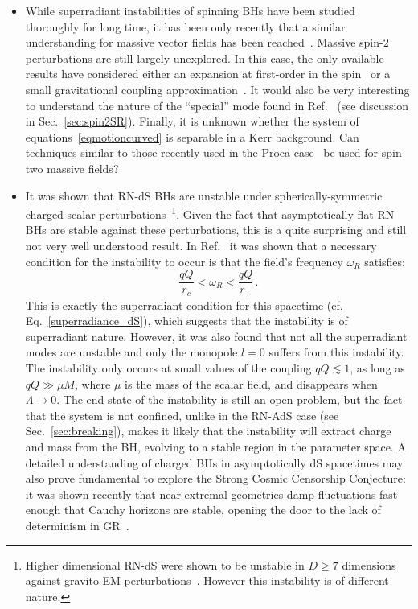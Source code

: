 \documentclass[11pt]{article}
\newcommand{\be}{\begin{equation}}
\newcommand{\ee}{\end{equation}}
\numberwithin{equation}{section} %
\begin{document}
\begin{itemize}

\item While superradiant instabilities of spinning BHs have been studied thoroughly for long time, it has 
been only recently that a similar understanding for massive vector fields has been 
reached~\cite{Pani:2012vp,Pani:2012bp,Witek:2012tr,Baryakhtar:2017ngi,East:2017mrj,East:2018glu,Frolov:2018pys,
Frolov:2018ezx}. Massive spin-$2$ perturbations are still largely unexplored.  
In this case, the only available results have considered either an expansion at first-order in the 
spin~\cite{Brito:2013wya} or a small gravitational coupling approximation~\cite{Brito:2020lup}. It would also be very 
interesting to understand the nature of the 
``special'' mode found in Ref.~\cite{Brito:2013wya} (see discussion in Sec.~\ref{sec:spin2SR}).
Finally, it is unknown whether the system of 
equations~\eqref{eqmotioncurved} is separable in a Kerr background. Can techniques similar to those recently used in 
the Proca case~\cite{Frolov:2018pys,Frolov:2018ezx} be used for spin-two massive fields?

\item It was shown that RN-dS BHs are unstable under 
spherically-symmetric charged scalar perturbations~\cite{Zhu:2014sya,Konoplya:2014lha,Destounis:2019hca}\footnote{Higher dimensional RN-dS 
were shown to be unstable in $D\geq 
7$ dimensions against gravito-EM perturbations~\cite{Konoplya:2008au,Cardoso:2010rz,Konoplya:2013sba}. However this 
instability is of different nature.}. Given the fact that asymptotically flat RN BHs are stable against these 
perturbations, this is a quite surprising and still not very well understood result. In Ref.~\cite{Konoplya:2014lha} it 
was shown that a necessary condition for the instability to occur is that the field's frequency $\omega_R$ satisfies:
%
\be
\frac{qQ}{r_c}<\omega_R<\frac{qQ}{r_+}\,.
\ee
%
This is exactly the superradiant condition for this spacetime  (cf. Eq.~\eqref{superradiance_dS}), which suggests that the instability is of superradiant nature. However, it was also found that not all the superradiant modes are unstable and only the monopole $l=0$ suffers from this instability. The instability only occurs at small values of the coupling $q Q\lesssim 1$, as long as $qQ\gg \mu M$, where $\mu$ is the mass of the scalar field, and disappears when $\Lambda\to 0$.  
The end-state of the instability is still an open-problem, but the fact that the system is not confined, unlike in the RN-AdS case (see Sec.~\ref{sec:breaking}), makes it likely that the instability will extract charge and mass from the BH, evolving to a stable region in the parameter space. 
A detailed understanding of charged BHs in asymptotically dS spacetimes may also prove fundamental to explore the Strong Cosmic Censorship Conjecture:
it was shown recently that near-extremal geometries damp fluctuations fast enough that Cauchy horizons are stable, opening the door to the lack of determinism in GR~\cite{Cardoso:2017soq,Luna:2018jfk,Dias:2018ufh,Dias:2018etb}.
 




\end{itemize}
\end{document}
